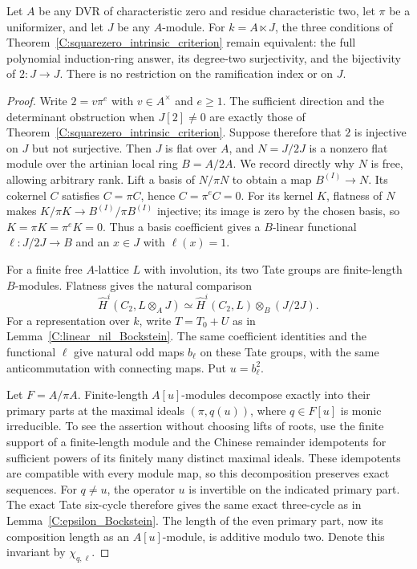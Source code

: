 \begin{theorem}
\label{C:ramified_squarezero_criterion}
Let $A$ be any DVR of characteristic zero and residue characteristic
two, let $\pi$ be a uniformizer, and let $J$ be any $A$-module.
For $k=A\ltimes J$, the three conditions of
Theorem~\ref{C:squarezero_intrinsic_criterion} remain equivalent:
the full polynomial induction-ring answer, its degree-two
surjectivity, and the bijectivity of $2:J\to J$.
There is no restriction on the ramification index or on $J$.
\end{theorem}
\begin{proof}
Write $2=v\pi^e$ with $v\in A^\times$ and $e\ge1$.
The sufficient direction and the determinant obstruction when
$J[2]\ne0$ are exactly those of
Theorem~\ref{C:squarezero_intrinsic_criterion}.
Suppose therefore that $2$ is injective on $J$ but not surjective.
Then $J$ is flat over $A$, and $N=J/2J$ is a nonzero flat module
over the artinian local ring $B=A/2A$.
We record directly why $N$ is free, allowing arbitrary rank.
Lift a basis of $N/\pi N$ to obtain a map $B^{(I)}\to N$.
Its cokernel $C$ satisfies $C=\pi C$, hence $C=\pi^eC=0$.
For its kernel $K$, flatness of $N$ makes
$K/\pi K\to B^{(I)}/\pi B^{(I)}$ injective; its image is zero
by the chosen basis, so $K=\pi K=\pi^eK=0$.
Thus a basis coefficient gives a $B$-linear functional
$\ell:J/2J\to B$ and an $x\in J$ with $\ell(x)=1$.

For a finite free $A$-lattice $L$ with involution, its two Tate
groups are finite-length $B$-modules. Flatness gives the natural
comparison
\[
 \widehat H^i(C_2,L\otimes_AJ)
    \simeq \widehat H^i(C_2,L)\otimes_B(J/2J).
\]
For a representation over $k$, write $T=T_0+U$ as in
Lemma~\ref{C:linear_nil_Bockstein}. The same coefficient identities
and the functional $\ell$ give natural odd maps $b_\ell$ on these
Tate groups, with the same anticommutation with connecting maps.
Put $u=b_\ell^2$.

Let $F=A/\pi A$. Finite-length $A[u]$-modules decompose exactly
into their primary parts at the maximal ideals $(\pi,q(u))$,
where $q\in F[u]$ is monic irreducible. To see the assertion
without choosing lifts of roots, use the finite support of a
finite-length module and the Chinese remainder idempotents for
sufficient powers of its finitely many distinct maximal ideals.
These idempotents are compatible with every module map, so this
decomposition preserves exact sequences. For $q\ne u$, the
operator $u$ is invertible on the indicated primary part.
The exact Tate six-cycle therefore gives the same exact
three-cycle as in Lemma~\ref{C:epsilon_Bockstein}. The length
of the even primary part, now its composition length as an
$A[u]$-module, is additive modulo two. Denote this invariant
by $\chi_{q,\ell}$.


\end{proof}
